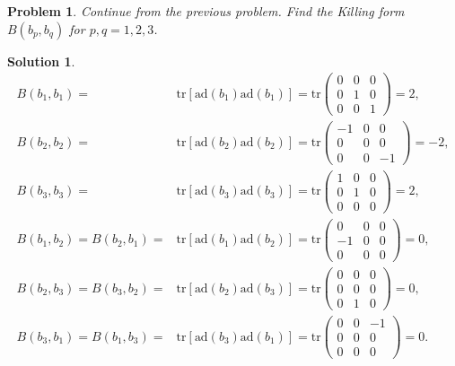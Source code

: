 \documentclass[UTF8,10pt,a4paper]{article}
\theoremstyle{Problem}
\newtheorem{prob}{Problem}
\theoremstyle{Solution}
\newtheorem*{sol}{Solution}
\begin{document}
\begin{prob}
    Continue from the previous problem. Find the Killing form $B(b_p,b_q)$ for $p,q=1,2,3$.
\end{prob}
\begin{sol}
    \begin{align}
        B(b_1,b_1)=&\text{tr}[\text{ad}(b_1)\text{ad}(b_1)]=\text{tr}\left(\begin{matrix}
            0&0&0\\
            0&1&0\\
            0&0&1
        \end{matrix}\right)=2,\\
        B(b_2,b_2)=&\text{tr}[\text{ad}(b_2)\text{ad}(b_2)]=\text{tr}\left(\begin{matrix}
            -1&0&0\\
            0&0&0\\
            0&0&-1
        \end{matrix}\right)=-2,\\
        B(b_3,b_3)=&\text{tr}[\text{ad}(b_3)\text{ad}(b_3)]=\text{tr}\left(\begin{matrix}
            1&0&0\\
            0&1&0\\
            0&0&0
        \end{matrix}\right)=2,\\
        B(b_1,b_2)=B(b_2,b_1)=&\text{tr}[\text{ad}(b_1)\text{ad}(b_2)]=\text{tr}\left(\begin{matrix}
            0&0&0\\
            -1&0&0\\
            0&0&0
        \end{matrix}\right)=0,\\
        B(b_2,b_3)=B(b_3,b_2)=&\text{tr}[\text{ad}(b_2)\text{ad}(b_3)]=\text{tr}\left(\begin{matrix}
            0&0&0\\
            0&0&0\\
            0&1&0
        \end{matrix}\right)=0,\\
        B(b_3,b_1)=B(b_1,b_3)=&\text{tr}[\text{ad}(b_3)\text{ad}(b_1)]=\text{tr}\left(\begin{matrix}
            0&0&-1\\
            0&0&0\\
            0&0&0
        \end{matrix}\right)=0.
    \end{align}
\end{sol}
\end{document}
